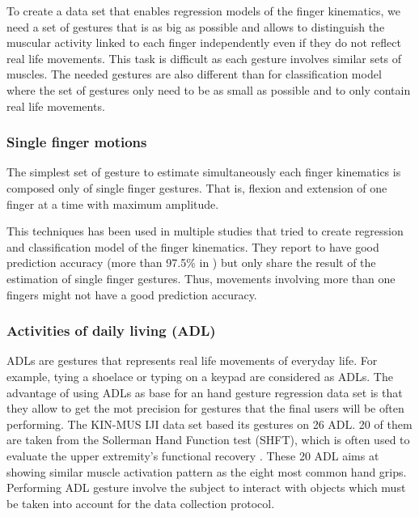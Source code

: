 To create a data set that enables regression models of the finger kinematics, we need a set of gestures that is as big as possible and allows to distinguish the muscular activity linked to each finger independently even if they do not reflect real life movements. This task is difficult as each gesture involves similar sets of muscles.
The needed gestures are also different than for classification model where the set of gestures only need to be as small as possible and to only contain real life movements.


\subsubsection{Single finger motions}

The simplest set of gesture to estimate simultaneously each finger kinematics is composed only of single finger gestures. That is, flexion and extension of one finger at a time with maximum amplitude. 

This techniques has been used in multiple studies \cite{ref:singleFingerGestPlusSignLang, ref:singleFingerGest1, ref:singleFingerGest2} that tried to create regression and classification model of the finger kinematics. They report to have good prediction accuracy (more than 97.5\% in \cite{ref:singleFingerGestPlusSignLang}) but only share the result of the estimation of single finger gestures. Thus, movements involving more than one fingers might not have a good prediction accuracy.


\subsubsection{Activities of daily living (ADL)}

ADLs are gestures that represents real life movements of everyday life. For example, tying a shoelace or typing on a keypad are considered as ADLs. The advantage of using ADLs as base for an hand gesture regression data set is that they allow to get the mot precision for gestures that the final users will be often performing. The KIN-MUS IJI data set \cite{ref:KinMusUji} based its gestures on 26 ADL. 20 of them are taken from the Sollerman Hand Function test (SHFT), which is often used to evaluate the upper extremity’s functional recovery \cite{doi:SHFT}. These 20 ADL aims at showing similar muscle activation pattern as the eight most common hand grips. Performing ADL gesture involve the subject to interact with objects which must be taken into account for the data collection protocol.


